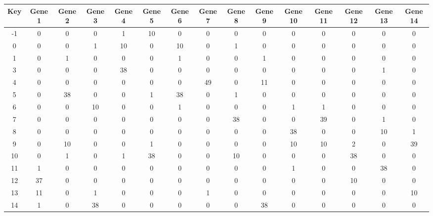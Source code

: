 \begin{tabular}{|c|c|c|c|c|c|c|c|c|c|c|c|c|c|c|}
\hline
Key & Gene 1 & Gene 2 & Gene 3 & Gene 4 & Gene 5 & Gene 6 & Gene 7 & Gene 8 & Gene 9 & Gene 10 & Gene 11 & Gene 12 & Gene 13 & Gene 14 \\
\hline
-1 & 0 & 0 & 0 & 1 & 10 & 0 & 0 & 0 & 0 & 0 & 0 & 0 & 0 & 0 \\
0 & 0 & 0 & 1 & 10 & 0 & 10 & 0 & 1 & 0 & 0 & 0 & 0 & 0 & 0 \\
1 & 0 & 1 & 0 & 0 & 0 & 1 & 0 & 0 & 1 & 0 & 0 & 0 & 0 & 0 \\
3 & 0 & 0 & 0 & 38 & 0 & 0 & 0 & 0 & 0 & 0 & 0 & 0 & 1 & 0 \\
4 & 0 & 0 & 0 & 0 & 0 & 0 & 49 & 0 & 11 & 0 & 0 & 0 & 0 & 0 \\
5 & 0 & 38 & 0 & 0 & 1 & 38 & 0 & 1 & 0 & 0 & 0 & 0 & 0 & 0 \\
6 & 0 & 0 & 10 & 0 & 0 & 1 & 0 & 0 & 0 & 1 & 1 & 0 & 0 & 0 \\
7 & 0 & 0 & 0 & 0 & 0 & 0 & 0 & 38 & 0 & 0 & 39 & 0 & 1 & 0 \\
8 & 0 & 0 & 0 & 0 & 0 & 0 & 0 & 0 & 0 & 38 & 0 & 0 & 10 & 1 \\
9 & 0 & 10 & 0 & 0 & 1 & 0 & 0 & 0 & 0 & 10 & 10 & 2 & 0 & 39 \\
10 & 0 & 1 & 0 & 1 & 38 & 0 & 0 & 10 & 0 & 0 & 0 & 38 & 0 & 0 \\
11 & 1 & 0 & 0 & 0 & 0 & 0 & 0 & 0 & 0 & 1 & 0 & 0 & 38 & 0 \\
12 & 37 & 0 & 0 & 0 & 0 & 0 & 0 & 0 & 0 & 0 & 0 & 10 & 0 & 0 \\
13 & 11 & 0 & 1 & 0 & 0 & 0 & 1 & 0 & 0 & 0 & 0 & 0 & 0 & 10 \\
14 & 1 & 0 & 38 & 0 & 0 & 0 & 0 & 0 & 38 & 0 & 0 & 0 & 0 & 0 \\
\hline
\end{tabular}